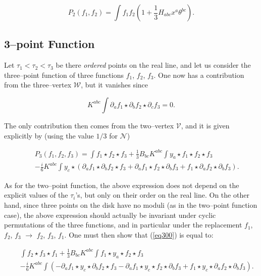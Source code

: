 \documentclass[a4paper,11pt]{article}
\begin{document}
\begin{equation}
P_{2}\left( f_{1},f_{2}\right) =\int f_{1}f_{2}\left( 1+\frac{1}{3} 
H_{abc}x^{a}\theta ^{bc}\right) .  \label{eq400}
\end{equation}


\subsection{3--point Function}


Let $\tau_{1} < \tau_{2} < \tau_{3}$ be there \textit{ordered} points on 
the real line, and let us consider the three--point function of three 
functions $f_{1}$, $f_{2}$, $f_{3}$. One now has a contribution from the 
three--vertex $\mathcal{W}$, but it vanishes since

$$
K^{abc}\int \partial _{a}f_{1}\star \partial _{b}f_{2}\star \partial
_{c}f_{3}=0.
$$

\noindent
The only contribution then comes from the two--vertex $\mathcal{V}$, and 
it is given explicitly by (using the value $1/3$ for $\mathcal{N}$) 

\begin{eqnarray}
&&P_{3}\left( f_{1},f_{2},f_{3}\right) =\int f_{1}\star f_{2}\star f_{3} 
+ \frac{1}{3}B_{bc}K^{abc}\int y_{a}\star f_{1}\star f_{2}\star f_{3}
\nonumber \\
&&-\frac{i}{6}K^{abc}\int y_{c}\star \left( \partial _{a}f_{1}\star 
\partial_{b}f_{2}\star f_{3}+\partial _{a}f_{1}\star f_{2}\star 
\partial_{b}f_{3}+f_{1}\star \partial _{a}f_{2}\star \partial_{b} f_{3} 
\right). \label{eq300}
\end{eqnarray}

\noindent
As for the two--point function, the above expression does not depend on the
explicit values of the $\tau_{i}$'s, but only on their order on the real
line. On the other hand, since three points on the disk have no moduli (as
in the two--point function case), the above expression should actually be
invariant under cyclic permutations of the three functions, and in
particular under the replacement $f_{1}$, $f_{2}$, $f_{3}$ 
$\rightarrow$ $f_{2}$, $f_{3}$, $f_{1}$. One must then show that (\ref{eq300}) 
is equal to:

\begin{eqnarray*}
&&\int f_{2}\star f_{3}\star f_{1}+\frac{1}{3}B_{bc}K^{abc}\int f_{1}\star
y_{a}\star f_{2}\star f_{3} \\
&&-\frac{i}{6}K^{abc}\int \left( -\partial _{a}f_{1}\star y_{c}\star
\partial _{b}f_{2}\star f_{3}-\partial _{a}f_{1}\star y_{c}\star f_{2}\star
\partial _{b}f_{3}+f_{1}\star y_{c}\star \partial _{a}f_{2}\star \partial
_{b}f_{3}\right) .
\end{eqnarray*}
\end{document}
